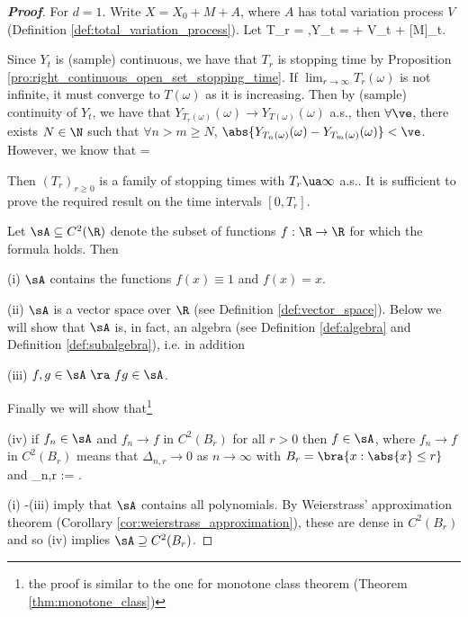 \begin{proof}[\bf Proof]
For $d = 1$. Write $X = X_0 +M + A$, where $A$ has total variation process $V$ (Definition \ref{def:total_variation_process}). Let
\be
T_r = \inf{},\qquad {}Y_t =  + V_t + [M]_t.
\ee

Since $Y_t$ is (sample) continuous, we have that $T_r$ is stopping time by Proposition \ref{pro:right_continuous_open_set_stopping_time}. If $\lim_{r\to \infty}T_r(\omega)$ is not infinite, it must converge to $T(\omega)$ as it is increasing. Then by (sample) continuity of $Y_t$, we have that $Y_{T_r(\omega)}(\omega) \to Y_{T(\omega)}(\omega)$ a.s., then $\forall \ve$, there exists $N\in \N$ such that $\forall n>m \geq N$, $\abs{Y_{T_n(\omega)}(\omega) - Y_{T_m(\omega)}(\omega)}< \ve$. However, we know that
\be
{} =  \qquad {}
\ee%

Then $(T_r)_{r\geq 0}$ is a family of stopping times with $T_r \ua \infty$ a.s.. It is sufficient to prove the required result on the time intervals $[0, T_r]$.

Let $\sA \subseteq C^2(\R)$ denote the subset of functions $f:\R \to \R$ for which the formula holds. Then
\ben
\item [(i)] $\sA$ contains the functions $f(x) \equiv 1$ and $f(x) = x$.
\item [(ii)] $\sA$ is a vector space over $\R$ (see Definition \ref{def:vector_space}).
\een
Below we will show that $\sA$ is, in fact, an algebra (see Definition \ref{def:algebra} and Definition \ref{def:subalgebra}), i.e. in addition
\ben
\item [(iii)] $f, g \in \sA \ \ra\ f g \in \sA$.
\een

Finally we will show that\footnote{the proof is similar to the one for monotone class theorem (Theorem \ref{thm:monotone_class})}
\ben
\item [(iv)] if $f_n \in \sA$ and $f_n \to f$ in $C^2(B_r)$ for all $r > 0$ then $f \in \sA$, where $f_n \to f$ in $C^2(B_r)$ means that $\Delta_{n,r} \to 0$ as $n\to\infty$ with $B_r =\bra{x:\abs{x} \leq r}$ and
\be
\Delta_{n,r} := \max {}.
\ee
\een

(i) -(iii) imply that $\sA$ contains all polynomials. By Weierstrass' approximation theorem (Corollary \ref{cor:weierstrass_approximation}), these are dense in $C^2(B_r)$ and so (iv) implies $\sA \supseteq C^2(B_r)$.


\end{proof}
